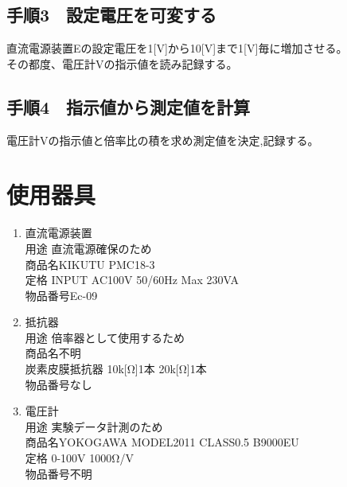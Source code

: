 \documentclass[titlepage]{jarticle}
\begin{document}
\subsection{手順3　設定電圧を可変する}
直流電源装置Eの設定電圧を1[V]から10[V]まで1[V]毎に増加させる。\\
その都度、電圧計Vの指示値を読み記録する。
\subsection{手順4　指示値から測定値を計算}
電圧計Vの指示値と倍率比の積を求め測定値を決定,記録する。

\section{使用器具}
\begin{enumerate}
    \item 直流電源装置\\用途 直流電源確保のため\\商品名KIKUTU PMC18-3\\定格 INPUT AC100V 50/60Hz Max 230VA\\物品番号Ec-09
    \item 抵抗器\\用途 倍率器として使用するため\\商品名不明\\炭素皮膜抵抗器 10k[Ω]1本 20k[Ω]1本\\物品番号なし
    \item 電圧計\\用途 実験データ計測のため\\商品名YOKOGAWA MODEL2011 CLASS0.5 B9000EU\\定格 0-100V 1000Ω/V\\物品番号不明
\end{enumerate}
\end{document}
